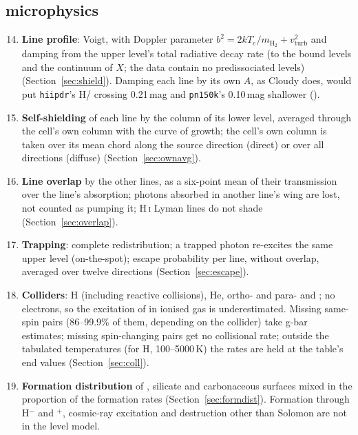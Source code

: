 \subsection{\texorpdfstring{\Htwo}{H2} microphysics}
\begin{enumerate}\setcounter{enumi}{13}
\item \textbf{Line profile}: Voigt, with Doppler parameter
  $b^2=2kT_e/m_{\mathrm{H_2}}+v_{\mathrm{turb}}^2$ and damping from the
  upper level's total radiative decay rate (to the bound levels and the
  continuum of $X$; the data contain no predissociated levels)
  (Section~\ref{sec:shield}). Damping each line by its own $A$, as Cloudy does,
  would put \texttt{hiipdr}'s H/\Htwo{} crossing 0.21\,mag and \texttt{pn150k}'s
  0.10\,mag shallower ().
\item \textbf{Self-shielding} of each line by the column of its lower level,
  averaged through the cell's own column with the curve of growth; the cell's
  own column is taken over its mean chord along the source direction (direct)
  or over all directions (diffuse) (Section~\ref{sec:ownavg}).
\item \textbf{Line overlap} by the other \Htwo{} lines, as a six-point mean of
  their transmission over the line's absorption; photons absorbed in another
  line's wing are lost, not counted as pumping it; H\,\textsc{i} Lyman lines do
  not shade (Section~\ref{sec:overlap}).
\item \textbf{Trapping}: complete redistribution; a trapped photon re-excites
  the same upper level (on-the-spot); escape probability per line, without
  overlap, averaged over twelve directions (Section~\ref{sec:escape}).
\item \textbf{Colliders}: H (including reactive collisions), He, ortho- and
  para-\Htwo{} and \Hp; no electrons, so the excitation of \Htwo{} in ionised
  gas is underestimated. Missing same-spin pairs (86--99.9\% of them, depending
  on the collider) take g-bar estimates; missing spin-changing pairs get no
  collisional rate; outside the tabulated temperatures (for H, 100--5000\,K) the
  rates are held at the table's end values (Section~\ref{sec:coll}).
\item \textbf{Formation distribution} of \citet{TakahashiUehara2001},
  silicate and carbonaceous surfaces mixed in the proportion of the formation
  rates (Section~\ref{sec:formdist}). Formation through H$^-$ and \Htwo$^+$,
  cosmic-ray excitation and destruction other than Solomon are not in the
  level model.
\end{enumerate}


